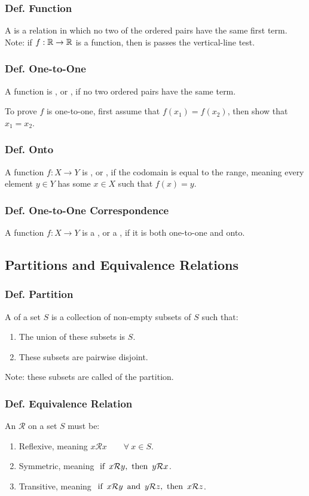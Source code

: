 \subsubsection{Def. Function}
A  is a relation in which no two of the ordered pairs have the same first term. Note: if $f:\mathbb{R} \rightarrow \mathbb{R}$ is a function, then is passes the vertical-line test.

\subsubsection{Def. One-to-One}
A function is , or , if no two ordered pairs have the same  term.

To prove $f$ is one-to-one, first assume that $f(x_1) = f(x_2)$, then show that $x_1 = x_2$.

\subsubsection{Def. Onto}
A function $f: X \rightarrow Y$ is , or , if the codomain is equal to the range, meaning every element $y \in Y$ has some $x \in X$ such that $f(x) = y$.

\subsubsection{Def. One-to-One Correspondence}
A function $f: X \rightarrow Y$ is a , or a , if it is both one-to-one and onto.

\subsection{Partitions and Equivalence Relations}

\subsubsection{Def. Partition}
A  of a set $S$ is a collection of non-empty subsets of $S$ such that:
\begin{enumerate}
    \item The union of these subsets is $S$.
    \item These subsets are pairwise disjoint.
\end{enumerate}
Note: these subsets are called  of the partition.

\subsubsection{Def. Equivalence Relation}
An  $\mathcal{R}$ on a set $S$ must be:
\begin{enumerate}
    \item Reflexive, meaning $x\mathcal{R}x \qquad \forall~x \in S$.
    \item Symmetric, meaning $\operatorname{~\text{if}~} x\mathcal{R}y, \operatorname{~\text{then}~} y\mathcal{R}x$.
    \item Transitive, meaning $\operatorname{~\text{if}~} x\mathcal{R}y \operatorname{~\text{and}~} y\mathcal{R}z, \operatorname{~\text{then}~} x\mathcal{R}z$.
\end{enumerate}

